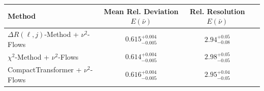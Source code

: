     \begin{tabular}{lccc}
        \toprule
        Method & Mean Rel. Deviation $E(\bar{\nu})$ & Rel. Resolution $E(\bar{\nu})$ \\
        \midrule
        $\Delta R(\ell,j)$-Method + $\nu^2$-Flows & $0.615^{+0.004}_{-0.005}$ & $2.94^{+0.05}_{-0.08}$ \\
        $\chi^2$-Method + $\nu^2$-Flows & $0.614^{+0.004}_{-0.005}$ & $2.98^{+0.05}_{-0.05}$ \\
        CompactTransformer + $\nu^2$-Flows & $0.616^{+0.004}_{-0.005}$ & $2.95^{+0.04}_{-0.05}$ \\
        \bottomrule
    \end{tabular}
